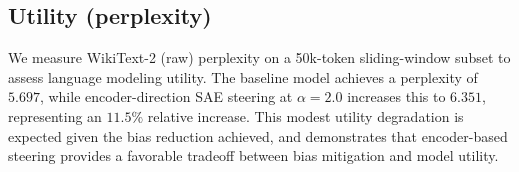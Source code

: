 

\subsection{Utility (perplexity)}

We measure WikiText-2 (raw) perplexity on a 50k-token sliding-window subset to assess language modeling utility. The baseline model achieves a perplexity of $5.697$, while encoder-direction SAE steering at $\alpha{=}2.0$ increases this to $6.351$, representing an $11.5\%$ relative increase. This modest utility degradation is expected given the bias reduction achieved, and demonstrates that encoder-based steering provides a favorable tradeoff between bias mitigation and model utility.



